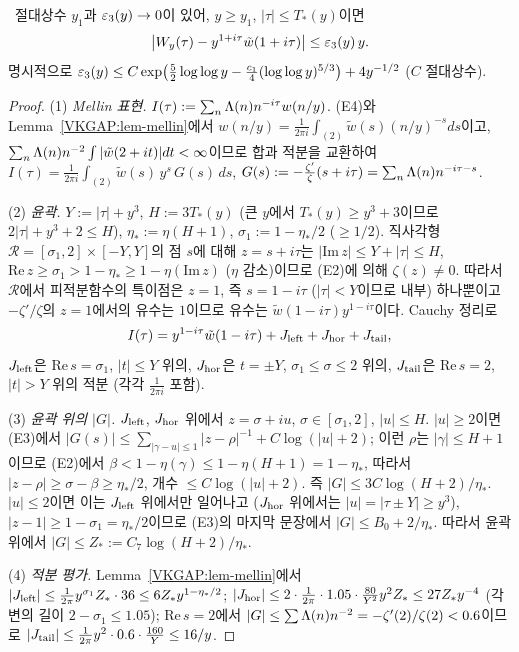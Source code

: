 \begin{lemma}\label{VKGAP:lem-VK}
\ 절대상수 $y_1$과 $\varepsilon_3(y)\to0$이 있어, $y\ge y_1$, $|\tau|\le T_*(y)$이면
\[
\big|W_y(\tau)-y^{1+i\tau}\tilde w(1+i\tau)\big|\le\varepsilon_3(y)\,y .
\]
명시적으로 $\varepsilon_3(y)\le C\exp\!\big(\tfrac52\log\log y-\tfrac{c_1}{4}(\log\log y)^{5/3}\big)+4y^{-1/2}$ ($C$ 절대상수).
\end{lemma}
\begin{proof}
(1) \emph{Mellin 표현.} $I(\tau):=\sum_n\Lambda(n)n^{-i\tau}w(n/y)$. (E4)와 Lemma~\ref{VKGAP:lem-mellin}에서
$w(n/y)=\frac1{2\pi i}\int_{(2)}\tilde w(s)(n/y)^{-s}ds$이고, $\sum_n\Lambda(n)n^{-2}\int|\tilde w(2+it)|dt<\infty$이므로
합과 적분을 교환하여
$I(\tau)=\frac1{2\pi i}\int_{(2)}\tilde w(s)\,y^s\,G(s)\,ds$, $G(s):=-\frac{\zeta'}{\zeta}(s+i\tau)=\sum_n\Lambda(n)n^{-i\tau-s}$.

(2) \emph{윤곽.} $Y:=|\tau|+y^3$, $H:=3T_*(y)$ (큰 $y$에서 $T_*(y)\ge y^3+3$이므로 $2|\tau|+y^3+2\le H$),
$\eta_*:=\eta(H+1)$, $\sigma_1:=1-\eta_*/2$ ($\ge1/2$). 직사각형 $\mathcal R=[\sigma_1,2]\times[-Y,Y]$의 점 $s$에 대해
$z=s+i\tau$는 $|\mathrm{Im}\,z|\le Y+|\tau|\le H$, $\mathrm{Re}\,z\ge\sigma_1>1-\eta_*\ge1-\eta(\mathrm{Im}\,z)$ ($\eta$ 감소)이므로 (E2)에 의해 $\zeta(z)\ne0$.
따라서 $\mathcal R$에서 피적분함수의 특이점은 $z=1$, 즉 $s=1-i\tau$ ($|\tau|<Y$이므로 내부) 하나뿐이고
$-\zeta'/\zeta$의 $z=1$에서의 유수는 $1$이므로 유수는 $\tilde w(1-i\tau)y^{1-i\tau}$이다. Cauchy 정리로
\[
I(\tau)=y^{1-i\tau}\tilde w(1-i\tau)+J_{\rm left}+J_{\rm hor}+J_{\rm tail},
\]
$J_{\rm left}$은 $\mathrm{Re}\,s=\sigma_1$, $|t|\le Y$ 위의, $J_{\rm hor}$은 $t=\pm Y$, $\sigma_1\le\sigma\le2$ 위의,
$J_{\rm tail}$은 $\mathrm{Re}\,s=2$, $|t|>Y$ 위의 적분 (각각 $\frac1{2\pi i}$ 포함).

(3) \emph{윤곽 위의 $|G|$.} $J_{\rm left}$, $J_{\rm hor}$ 위에서 $z=\sigma+iu$, $\sigma\in[\sigma_1,2]$, $|u|\le H$.
$|u|\ge2$이면 (E3)에서 $|G(s)|\le\sum_{|\gamma-u|\le1}|z-\rho|^{-1}+C\log(|u|+2)$; 이런 $\rho$는 $|\gamma|\le H+1$이므로
(E2)에서 $\beta<1-\eta(\gamma)\le1-\eta(H+1)=1-\eta_*$,
따라서 $|z-\rho|\ge\sigma-\beta\ge\eta_*/2$, 개수 $\le C\log(|u|+2)$. 즉 $|G|\le 3C\log(H+2)/\eta_*$.
$|u|\le2$이면 이는 $J_{\rm left}$ 위에서만 일어나고 ($J_{\rm hor}$ 위에서는 $|u|=|\tau\pm Y|\ge y^3$),
$|z-1|\ge1-\sigma_1=\eta_*/2$이므로 (E3)의 마지막 문장에서 $|G|\le B_0+2/\eta_*$.
따라서 윤곽 위에서 $|G|\le Z_*:=C_7\log(H+2)/\eta_*$.

(4) \emph{적분 평가.} Lemma~\ref{VKGAP:lem-mellin}에서
$|J_{\rm left}|\le\frac{1}{2\pi}y^{\sigma_1}Z_*\cdot36\le 6Z_*y^{1-\eta_*/2}$;
$|J_{\rm hor}|\le 2\cdot\frac1{2\pi}\cdot1.05\cdot\frac{80}{Y^2}y^2Z_*\le 27Z_*y^{-4}$ (각 변의 길이 $2-\sigma_1\le1.05$);
$\mathrm{Re}\,s=2$에서 $|G|\le\sum\Lambda(n)n^{-2}=-\zeta'(2)/\zeta(2)<0.6$이므로
$|J_{\rm tail}|\le\frac1{2\pi}y^2\cdot0.6\cdot\frac{160}{Y}\le 16/y$.


\end{proof}
